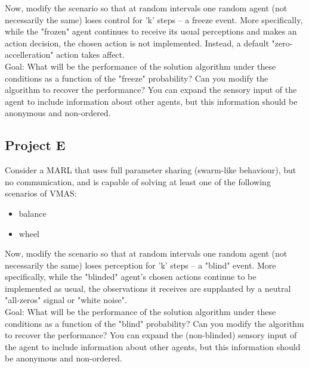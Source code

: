 \documentclass[a4paper,11pt]{article}
\begin{document}
Now, modify the scenario so that at random intervals one random agent (not necessarily the same) loses control for 'k' steps -- a freeze event. More specifically, while the "frozen" agent continues to receive its usual perceptions and makes an action decision, the chosen action is not implemented. Instead, a default "zero-accelleration" action takes affect.
\\
Goal: What will be the performance of the solution algorithm under these conditions as a function of the "freeze" probability? Can you modify the algorithm to recover the performance? You can expand the sensory input of the agent to include information about other agents, but this information should be anonymous and non-ordered. 

\subsection*{Project E}
Consider a MARL that uses full parameter sharing (swarm-like behaviour), but no communication, and is capable of solving at least one of the following scenarios of VMAS:
\begin{itemize}
    \item balance
    \item wheel
\end{itemize}

Now, modify the scenario so that at random intervals one random agent (not necessarily the same) loses perception for 'k' steps -- a "blind" event. More specifically, while the "blinded" agent's chosen actions continue to be implemented as usual, the observations it receives are supplanted by a neutral "all-zeros" signal or "white noise".
\\
Goal: What will be the performance of the solution algorithm under these conditions as a function of the "blind" probability? Can you modify the algorithm to recover the performance? You can expand the (non-blinded) sensory input of the agent to include information about other agents, but this information should be anonymous and non-ordered. 
\end{document}
